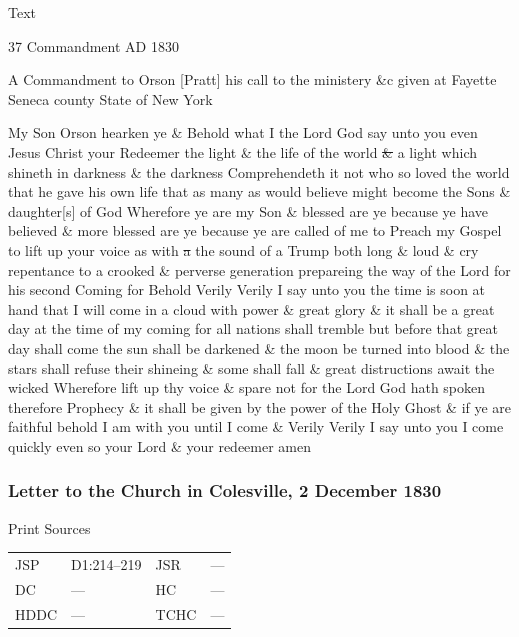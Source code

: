 			\begin{description}
				\item[Text]
			\end{description}
			
				\begin{tightcenter}
				37 Commandment AD 1830
				\end{tightcenter}
				
				A Commandment to Orson [Pratt] his call to the ministery \&c given at Fayette Seneca county State of New York
				
				My Son Orson hearken ye \& Behold what I the Lord God say unto you even Jesus Christ your Redeemer the light \& the life of the world \sout{\&} a light which shineth in darkness \& the darkness Comprehendeth it not who so loved the world that he gave his own life that as many as would believe might become the Sons \& daughter[s] of God Wherefore ye are my Son \& blessed are ye because ye have believed \& more blessed are ye because ye are called of me to Preach my Gospel to lift up your voice as with \sout{a} the sound of a Trump both long \& loud \& cry repentance to a crooked \& perverse generation prepareing the way of the Lord for his second Coming for Behold Verily Verily I say unto you the time is soon at hand that I will come in a cloud with power \& great glory \& it shall be a great day at the time of my coming for all nations shall tremble but before that great day shall come the sun shall be darkened \& the moon be turned into blood \& the stars shall refuse their shineing \& some shall fall \& great distructions await the wicked Wherefore lift up thy voice \& spare not for the Lord God hath spoken therefore Prophecy \& it shall be given by the power of the Holy Ghost \& if ye are faithful behold I am with you until I come \& Verily Verily I say unto you I come quickly even so your Lord \& your redeemer amen
				
		\subsubsection{Letter to the Church in Colesville, 2 December 1830}
			\label{EMS-1830-JS-2-DEC-1830}
		
			\begin{description}
				\item[Print Sources]
			\end{description}

				\begin{tabular}{p{0.5in}p{1in}p{0.5in}p{1in}}
				JSP	 	& D1:214--219	& JSR 		& --- \\
				DC	 	& ---			& HC 		& --- \\
				HDDC 	& ---			& TCHC 		& --- \\
				\end{tabular}
			
